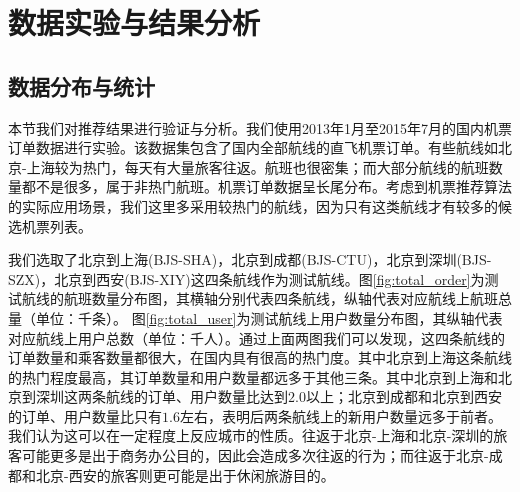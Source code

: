 \section{数据实验与结果分析}

\subsection{数据分布与统计}
本节我们对推荐结果进行验证与分析。我们使用2013年1月至2015年7月的国内机票订单数据进行实验。该数据集包含了国内全部航线的直飞机票订单。有些航线如北京-上海较为热门，每天有大量旅客往返。航班也很密集；而大部分航线的航班数量都不是很多，属于非热门航班。机票订单数据呈长尾分布。考虑到机票推荐算法的实际应用场景，我们这里多采用较热门的航线，因为只有这类航线才有较多的候选机票列表。

\begin{figure}
\centering
{}
\end{figure}\par

我们选取了北京到上海(BJS-SHA)，北京到成都(BJS-CTU)，北京到深圳(BJS-SZX)，北京到西安(BJS-XIY)这四条航线作为测试航线。图\ref{fig:total_order}为测试航线的航班数量分布图，其横轴分别代表四条航线，纵轴代表对应航线上航班总量（单位：千条）。
图\ref{fig:total_user}为测试航线上用户数量分布图，其纵轴代表对应航线上用户总数（单位：千人）。通过上面两图我们可以发现，这四条航线的订单数量和乘客数量都很大，在国内具有很高的热门度。其中北京到上海这条航线的热门程度最高，其订单数量和用户数量都远多于其他三条。其中北京到上海和北京到深圳这两条航线的订单、用户数量比达到$2.0$以上；北京到成都和北京到西安的订单、用户数量比只有$1.6$左右，表明后两条航线上的新用户数量远多于前者。我们认为这可以在一定程度上反应城市的性质。往返于北京-上海和北京-深圳的旅客可能更多是出于商务办公目的，因此会造成多次往返的行为；而往返于北京-成都和北京-西安的旅客则更可能是出于休闲旅游目的。\par

\begin{figure}
\centering
{}
\end{figure}\par

